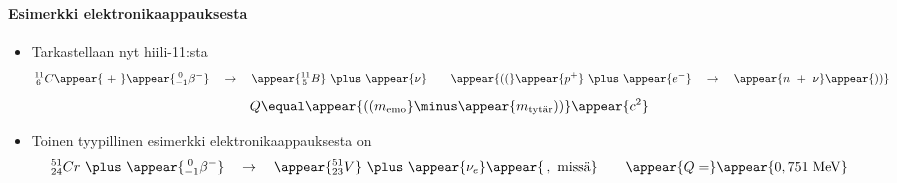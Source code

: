 \begin{frame}
\frametitle{\texorpdfstring{\culine[\sectiontitleulinecolor]{\sectiontitle}}{\sectiontitle} }
\framesubtitle{Esimerkki elektronikaappauksesta}
\appear{}

% 
\begin{itemize}
	\item Tarkastellaan nyt hiili-11:sta  
\[
{ }_{\,6}^{11} C \appear{~+~} \appear{ _{-1}^{\;0} \beta^{-}} \quad \rightarrow \quad \appear{{ }_{\,5}^{11} B}  ~\plus~ \appear{\nu} \qquad \appear{\textrm{((}} \appear{p^{+}}  ~\plus~ \appear{e^{-}} \quad \rightarrow \quad  \appear{n~+~\nu} \appear{\textrm{))}}
\]
  
\[
Q  \equal  \appear{\textrm{((} m_{\text {emo}}}  \minus \appear{m_{\text {tytär}} \textrm{))} } \appear{c^{2}}
\]

\item Toinen tyypillinen esimerkki elektronikaappauksesta on 
\[
 { }_{24}^{51} C r  ~\plus~ \appear{ _{-1}^{\;0} \beta^{-}} \quad \rightarrow \quad \appear{{ }_{23}^{51} V}  ~\plus~ \appear{\nu_{e}} \appear{\,,~ \text{missä}} \qquad  \appear{Q=}\appear{0,751 \mathrm{\;MeV}}
 \]
\end{itemize}

\endofslide 
\end{frame}

